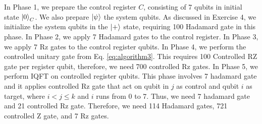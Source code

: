 \documentclass[a4paper, 11pt]{article}
\begin{document}
In Phase 1, we prepare the control register $C$, consisting of 7 qubits in initial state $\ket{0}_C$.
We also prepare $\ket{\psi}$  the system qubits. As discussed in Exercise 4, we initialize the system qubits in the $\ket{+}$ state, requiring 100 Hadamard gate in this phase. 
In Phase 2, we apply 7 Hadamard gates to the control register.
In Phase 3, we apply 7 Rz gates to the control register qubits.
In Phase 4, we perform the controlled unitary gate from Eq. \ref{eq:algorithm3}. This requires 100 Controlled RZ gate per register qubit, therefore, we need 700 controlled Rz gates.
In Phase 5, we perform  IQFT on controlled register qubits. 
This phase involves 7 hadamard gate and it applies controlled Rz gate that act on qubit in $j$ as control and qubit $i$ as target, 
where $i<j \leq k$ and $i$ runs from 0 to 7. Thus, we need 7 hadamard gate and 21 controlled Rz gate. 
Therefore, we need 114 Hadamard gates, 721 controlled Z gate, and 7 Rz gates.  






\end{document}
